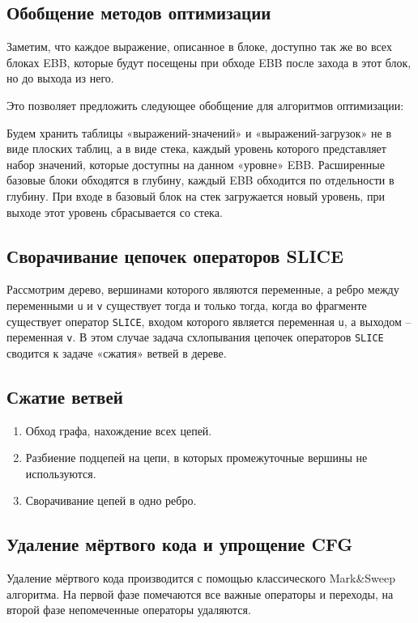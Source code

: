 \documentclass[11pt]{article}
\begin{document}
\subsection{Обобщение методов оптимизации}
\label{sec:orgf62f093}
Заметим, что каждое выражение, описанное в блоке, доступно так же во всех блоках EBB, которые будут посещены при обходе EBB после захода в этот блок, но до выхода из него. 

Это позволяет предложить следующее обобщение для алгоритмов оптимизации:

Будем хранить таблицы «выражений-значений» и «выражений-загрузок» не в виде плоских таблиц, а в виде стека, каждый уровень которого представляет набор значений, которые доступны на данном «уровне» EBB. Расширенные базовые блоки обходятся в глубину, каждый EBB обходится по отдельности в глубину. При входе в базовый блок на стек загружается новый уровень, при выходе этот уровень сбрасывается со стека.
\subsection{Сворачивание цепочек операторов SLICE}
\label{sec:orge12e163}
Рассмотрим дерево, вершинами которого являются переменные, а ребро между переменными \texttt{u} и \texttt{v} существует тогда и только тогда, когда во фрагменте существует оператор \texttt{SLICE}, входом которого является переменная \texttt{u}, а выходом -- переменная \texttt{v}. В этом случае задача схлопывания цепочек операторов \texttt{SLICE} сводится к задаче «сжатия» ветвей в дереве.
\subsection{Сжатие ветвей}
\label{sec:orgdd3c82d}
\begin{enumerate}
\item Обход графа, нахождение всех цепей.
\item Разбиение подцепей на цепи, в которых промежуточные вершины не используются.
\item Сворачивание цепей в одно ребро.
\end{enumerate}
\subsection{Удаление мёртвого кода и упрощение CFG}
\label{sec:org14d83fb}
Удаление мёртвого кода производится с помощью классического Mark\&Sweep алгоритма. На первой фазе помечаются все важные операторы и переходы, на второй фазе непомеченные операторы удаляются.
\end{document}

